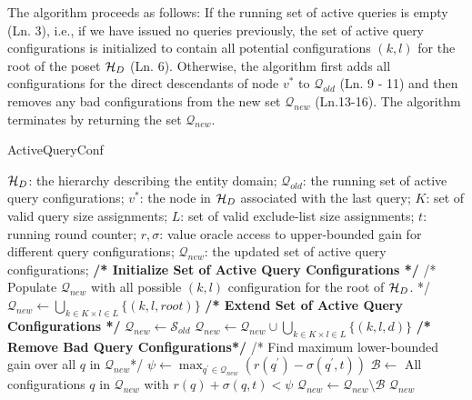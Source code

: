 The algorithm proceeds as follows: If the running set of active queries is empty (Ln. 3), i.e., if we have issued no queries previously, the set of active query configurations is initialized to contain all potential configurations $(k,l)$ for the root of the poset $\mathcal{H}_D$ (Ln. 6). Otherwise, the algorithm first adds all configurations for the direct descendants of node $v^*$ to $\mathcal{Q}_{old}$ (Ln. 9 - 11) and then removes any bad configurations from the new set $\mathcal{Q}_{new}$ (Ln.13-16). The algorithm terminates by returning the set $\mathcal{Q}_{new}$.

\begin{algorithm}[h]
\footnotesize\caption{ActiveQueryConf}
\label{algo:updateactions}
\begin{algorithmic}[1]
 $\mathcal{H}_D$: the hierarchy describing the entity domain; $\mathcal{Q}_{old}$: the running set of active query configurations; $v^*$: the node in $\mathcal{H}_D$ associated with the last query; $K$: set of valid query size assignments; $L$: set of valid exclude-list size assignments; $t$: running round counter; $r,\sigma$: value oracle access to upper-bounded gain for different query configurations;
 $\mathcal{Q}_{new}$: the updated set of active query configurations;
	\STATE \textbf{/* Initialize Set of Active Query Configurations */}
	\STATE /* Populate ${\mathcal{Q}_{new}}$ with all possible $(k,l)$ configuration for the root of $\mathcal{H}_D$. */
	\STATE ${\mathcal{Q}_{new}} \leftarrow \bigcup_{k \in K \times l \in L} \{ (k,l,root) \}$
\ELSE
	\STATE \textbf{/* Extend Set of Active Query Configurations */}
	\STATE $\mathcal{Q}_{new} \leftarrow \mathcal{S}_{old}$
	\STATE $\mathcal{Q}_{new} \leftarrow \mathcal{Q}_{new} \cup \bigcup_{k \in K \times l \in L} \{(k,l,d)\}$
	\ENDFOR
	\STATE \textbf{/* Remove Bad Query Configurations*/}
	\STATE /* Find maximum lower-bounded gain over all $q$ in $\mathcal{Q}_{new}$*/
	\STATE $\psi \leftarrow \max_{q^{\prime} \in \mathcal{Q}_{new}} (r(q^{\prime}) - \sigma(q^{\prime},t))$  
	\STATE $\mathcal{B} \leftarrow$ All configurations $q$ in $\mathcal{Q}_{new}$ with $r(q) + \sigma(q,t) < \psi$
	\STATE $\mathcal{Q}_{new} \leftarrow \mathcal{Q}_{new} \setminus \mathcal{B}$
\ENDIF 
\RETURN $\mathcal{Q}_{new}$
\end{algorithmic}
\end{algorithm}
\vspace{-5pt}
